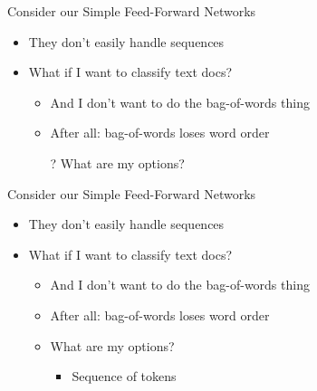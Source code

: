 \documentclass[aspectratio=169]{beamer}
\begin{document}
\begin{frame}{Consider our Simple Feed-Forward Networks}

\begin{itemize}
	\item They don't easily handle sequences
	\item What if I want to classify text docs?
	\begin{itemize}
	\item And I don't want to do the bag-of-words thing
	\item After all: bag-of-words loses word order
	\item[?] What are my options?
	\end{itemize}
\end{itemize}
\end{frame}
\begin{frame}{Consider our Simple Feed-Forward Networks}

\begin{itemize}
	\item They don't easily handle sequences
	\item What if I want to classify text docs?
	\begin{itemize}
	\item And I don't want to do the bag-of-words thing
	\item After all: bag-of-words loses word order
	\item What are my options?
		\begin{itemize}
		\item Sequence of tokens
		\end{itemize}
	\end{itemize}
\end{itemize}
\end{frame}
\end{document}
